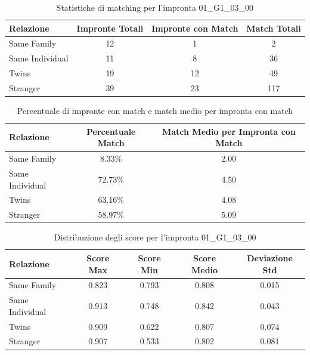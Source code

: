 \begin{table}[htbp]
\centering
\caption{Statistiche di matching per l'impronta 01\_G1\_03\_00}
\label{tab:results_01_G1_03_00}
\begin{tabular}{|l|c|c|c|}
\hline
\textbf{Relazione} & \textbf{Impronte Totali} & \textbf{Impronte con Match} & \textbf{Match Totali} \\
\hline
Same Family & 12 & 1 & 2 \\
\hline
Same Individual & 11 & 8 & 36 \\
\hline
Twins & 19 & 12 & 49 \\
\hline
Stranger & 39 & 23 & 117 \\
\hline
\end{tabular}
\end{table}


\begin{table}[htbp]
\centering
\caption{Percentuale di impronte con match e match medio per impronta con match}
\label{tab:match_percentage_01_G1_03_00}
\begin{tabular}{|l|c|c|}
\hline
\textbf{Relazione} & \textbf{Percentuale Match} & \textbf{Match Medio per Impronta con Match} \\
\hline
Same Family & 8.33\% & 2.00 \\
\hline
Same Individual & 72.73\% & 4.50 \\
\hline
Twins & 63.16\% & 4.08 \\
\hline
Stranger & 58.97\% & 5.09 \\
\hline
\end{tabular}
\end{table}


\begin{table}[htbp]
\centering
\caption{Distribuzione degli score per l'impronta 01\_G1\_03\_00}
\label{tab:scores_01_G1_03_00}
\begin{tabular}{|l|c|c|c|c|}
\hline
\textbf{Relazione} & \textbf{Score Max} & \textbf{Score Min} & \textbf{Score Medio} & \textbf{Deviazione Std} \\
\hline
Same Family & 0.823 & 0.793 & 0.808 & 0.015 \\
\hline
Same Individual & 0.913 & 0.748 & 0.842 & 0.043 \\
\hline
Twins & 0.909 & 0.622 & 0.807 & 0.074 \\
\hline
Stranger & 0.907 & 0.533 & 0.802 & 0.081 \\
\hline
\end{tabular}
\end{table}

